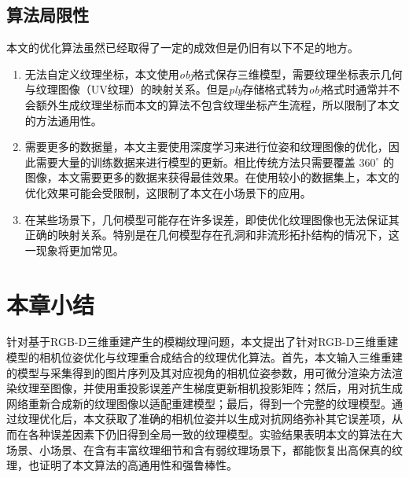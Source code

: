 \subsection{算法局限性}
本文的优化算法虽然已经取得了一定的成效但是仍旧有以下不足的地方。
\begin{enumerate}
\item 无法自定义纹理坐标，本文使用\emph{obj}格式保存三维模型，需要纹理坐标表示几何与纹理图像（UV纹理）的映射关系。但是\emph{ply}存储格式转为\emph{obj}格式时通常并不会额外生成纹理坐标而本文的算法不包含纹理坐标产生流程，所以限制了本文的方法通用性。
\item 需要更多的数据量，本文主要使用深度学习来进行位姿和纹理图像的优化，因此需要大量的训练数据来进行模型的更新。相比传统方法只需要覆盖 $360^{\circ} $ 的图像，本文需要更多的数据来获得最佳效果。在使用较小的数据集上，本文的优化效果可能会受限制，这限制了本文在小场景下的应用。
\item 在某些场景下，几何模型可能存在许多误差，即使优化纹理图像也无法保证其正确的映射关系。特别是在几何模型存在孔洞和非流形拓扑结构的情况下，这一现象将更加常见。
\end{enumerate}





\section{本章小结}

针对基于RGB-D三维重建产生的模糊纹理问题，本文提出了针对RGB-D三维重建模型的相机位姿优化与纹理重合成结合的纹理优化算法。首先，本文输入三维重建的模型与采集得到的图片序列及其对应视角的相机位姿参数，用可微分渲染方法渲染纹理至图像，并使用重投影误差产生梯度更新相机投影矩阵；然后，用对抗生成网络重新合成新的纹理图像以适配重建模型；最后，得到一个完整的纹理模型。通过纹理优化后，本文获取了准确的相机位姿并以生成对抗网络弥补其它误差项，从而在各种误差因素下仍旧得到全局一致的纹理模型。实验结果表明本文的算法在大场景、小场景、在含有丰富纹理细节和含有弱纹理场景下，都能恢复出高保真的纹理，也证明了本文算法的高通用性和强鲁棒性。



